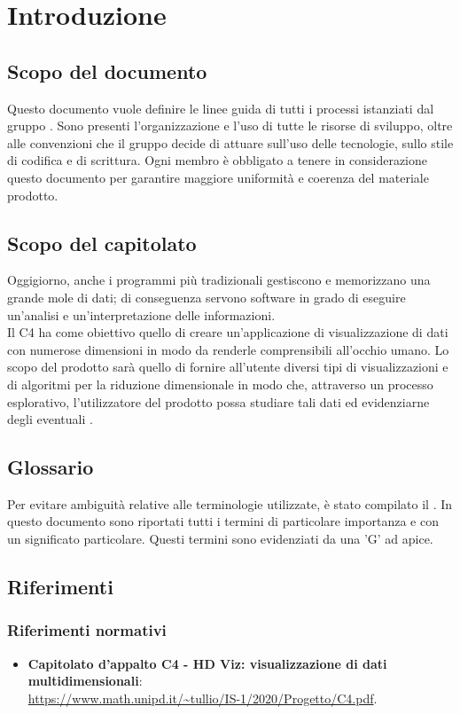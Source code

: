 \section{Introduzione}
\subsection{Scopo del documento}
Questo documento vuole definire le linee guida di tutti i processi istanziati dal gruppo \Gruppo{}. Sono presenti l'organizzazione e l'uso di tutte le risorse di sviluppo, oltre alle convenzioni che il gruppo decide di attuare sull'uso delle tecnologie, sullo stile di codifica e di scrittura. Ogni membro è obbligato a tenere in considerazione questo documento per garantire maggiore uniformità e coerenza del materiale prodotto.

\subsection{Scopo del capitolato}
Oggigiorno, anche i programmi più tradizionali gestiscono e memorizzano una grande mole di dati; di conseguenza servono software in grado di eseguire un'analisi e un'interpretazione delle informazioni.\\
Il  C4 ha come obiettivo quello di creare un'applicazione di visualizzazione di dati con numerose dimensioni in modo da renderle comprensibili all'occhio umano.  Lo scopo del prodotto sarà quello di fornire all'utente diversi tipi di visualizzazioni e di algoritmi per la riduzione dimensionale in modo che, attraverso un processo esplorativo, l'utilizzatore del prodotto possa studiare tali dati ed evidenziarne degli eventuali . 

\subsection{Glossario}
Per evitare ambiguità relative alle terminologie utilizzate, è stato compilato il . In questo documento sono riportati tutti i termini di particolare importanza e con un significato particolare. Questi termini sono evidenziati da una 'G' ad apice.

\subsection{Riferimenti}
\subsubsection{Riferimenti normativi}
\begin{itemize}	
	\item \textbf{Capitolato d'appalto C4 - HD Viz: visualizzazione di dati multidimensionali}:\\
	\textcolor{blue}{\url{https://www.math.unipd.it/~tullio/IS-1/2020/Progetto/C4.pdf}}.
\end{itemize}

